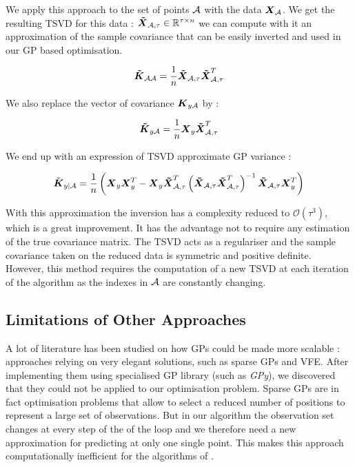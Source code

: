 We apply this approach to the set of points $\mathcal{A}$ with the data ${\boldsymbol{{X}}}_{\mathcal{A}}$. We get the resulting TSVD for this data : ${\boldsymbol{{\tilde{X}}}}_{\mathcal{A},\tau} \in \mathbb{R}^{\tau \times n}$ we can compute with it an approximation of the sample covariance that can be easily inverted and used in our GP based optimisation.

\begin{equation}
	{\boldsymbol{{\tilde{K}}}}_{\mathcal{A}\mathcal{A}} = \frac{1}{n}{\boldsymbol{{\tilde{X}}}}_{\mathcal{A},\tau}  {\boldsymbol{{\tilde{X}}}}_{\mathcal{A},\tau}^T
\end{equation}

We also replace the vector of covariance ${\boldsymbol{{K}}}_{y\mathcal{A}}$ by : 

\begin{equation}
	{\boldsymbol{{\tilde{K}}}}_{y\mathcal{A}} =  \frac{1}{n}{\boldsymbol{{X}}}_{y} {\boldsymbol{{\tilde{X}}}}_{\mathcal{A},\tau}^T
\end{equation}

We end up with an expression of TSVD approximate GP variance : 

\begin{equation}
	\tilde{{\boldsymbol{{K}}}}_{y | \mathcal{A}} =  \frac{1}{n} \left( {\boldsymbol{{X}}}_{y}{\boldsymbol{{X}}}_{y}^T - {\boldsymbol{{X}}}_{y} {\boldsymbol{{\tilde{X}}}}_{\mathcal{A},\tau}^T \left({\boldsymbol{{\tilde{X}}}}_{\mathcal{A},\tau}  {\boldsymbol{{\tilde{X}}}}_{\mathcal{A},\tau}^T \right)^{-1}  {\boldsymbol{{\tilde{X}}}}_{\mathcal{A},\tau} {\boldsymbol{{X}}}_{y}^T \right)
\end{equation}

With this approximation the inversion has a complexity reduced to $\mathcal{O}(\tau^3)$, which is a great improvement. It has the advantage not to require any estimation of the true covariance matrix. The TSVD acts as a regulariser and the sample covariance taken on the reduced data is symmetric and positive definite. \\

 However, this method requires the computation of a new TSVD at each iteration of the algorithm as the indexes in $\mathcal{A}$ are constantly changing. 
 

\subsection{Limitations of Other Approaches}

A lot of literature has been studied on how GPs could be made more scalable : approaches relying on very elegant solutions, such as sparse GPs and VFE. After implementing them using specialised GP library (such as \textit{GPy}), we discovered that they could not be applied to our optimisation problem. Sparse GPs are in fact optimisation problems that allow to select a reduced number of positions to represent a large set of observations. But in our algorithm the observation set changes at every step of the of the loop and we therefore need a new approximation for predicting at only one single point. This makes this approach computationally inefficient for the algorithms of \citet{krause_near-optimal_2008}. \\

